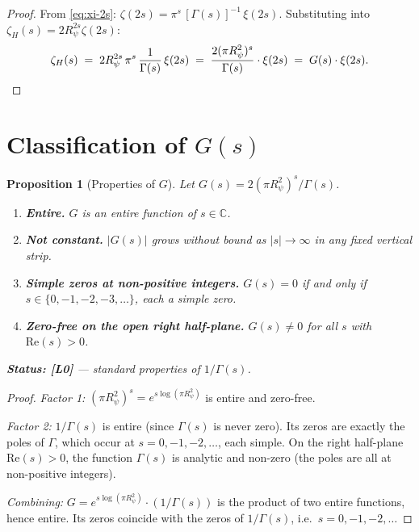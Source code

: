 \documentclass[11pt,a4paper]{article}
\newtheorem{proposition}[theorem]{Proposition}
\theoremstyle{definition}
\theoremstyle{remark}
\newcommand{\Rp}{R_{\psi}}
\newcommand{\ZH}{\zeta_{H}(s)}
\newcommand{\Gam}{\Gamma}
\begin{document}
\begin{proof}
From \eqref{eq:xi-2s}: $\zeta(2s) = \pi^s\,[\Gam(s)]^{-1}\,\xi(2s)$.
Substituting into $\ZH = 2\Rp^{2s}\zeta(2s)$:
\[
  \ZH \;=\; 2\Rp^{2s}\,\pi^s\,\frac{1}{\Gam(s)}\,\xi(2s)
       \;=\; \frac{2(\pi\Rp^2)^s}{\Gam(s)}\cdot\xi(2s)
       \;=\; G(s)\cdot\xi(2s). \qedhere
\]
\end{proof}

\section{Classification of $G(s)$}
\label{sec:classification}

\begin{proposition}[Properties of $G$]\label{prop:G}
Let $G(s) = 2(\pi\Rp^2)^s / \Gam(s)$.
\begin{enumerate}
  \item \textbf{Entire.}
        $G$ is an entire function of $s \in \mathbb{C}$.
  \item \textbf{Not constant.}
        $|G(s)|$ grows without bound as $|s| \to \infty$ in any fixed
        vertical strip.
  \item \textbf{Simple zeros at non-positive integers.}
        $G(s) = 0$ if and only if $s \in \{0, -1, -2, -3, \ldots\}$,
        each a simple zero.
  \item \textbf{Zero-free on the open right half-plane.}
        $G(s) \neq 0$ for all $s$ with $\mathrm{Re}(s) > 0$.
\end{enumerate}
\textbf{Status: [L0]} — standard properties of $1/\Gam(s)$.
\end{proposition}

\begin{proof}
\textit{Factor 1:} $({\pi\Rp^2})^s = e^{s\log(\pi\Rp^2)}$ is entire and
zero-free.

\textit{Factor 2:} $1/\Gam(s)$ is entire (since $\Gam(s)$ is never zero).
Its zeros are exactly the poles of $\Gam$, which occur at
$s = 0, -1, -2, \ldots$, each simple.  On the right half-plane
$\mathrm{Re}(s)>0$, the function $\Gam(s)$ is analytic and non-zero
(the poles are all at non-positive integers).

\textit{Combining:} $G = e^{s\log(\pi\Rp^2)} \cdot (1/\Gam(s))$ is the
product of two entire functions, hence entire.  Its zeros coincide with
the zeros of $1/\Gam(s)$, i.e.\ $s = 0, -1, -2, \ldots$
\end{proof}
\end{document}
